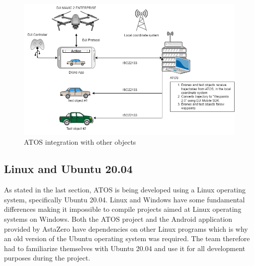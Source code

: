\begin{figure}[H]
  \centering
  \includegraphics[width=\columnwidth]{figure/flow_config.png}
  \caption{ATOS integration with other objects}
  \label{fig:ATOS-flow}
\end{figure}




\subsection{Linux and Ubuntu 20.04} \label{Linux}
As stated in the last section, ATOS is being developed using a Linux operating system, specifically Ubuntu 20.04. Linux and Windows have some fundamental differences making it impossible to compile projects aimed at Linux operating systems on Windows. Both the ATOS project and the Android application provided by AstaZero have dependencies on other Linux programs which is why an old version of the Ubuntu operating system was required. The team therefore had to familiarize themselves with Ubuntu 20.04 and use it for all development purposes during the project. 

